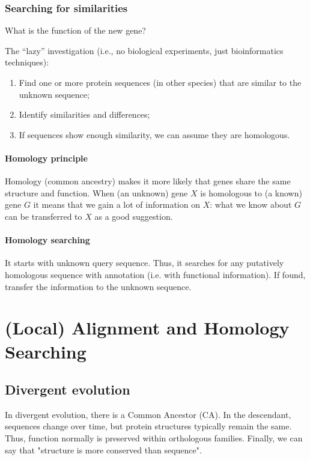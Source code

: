 \subsection{Searching for similarities}

What is the function of the new gene?

The “lazy” investigation (i.e., no biological experiments, just bioinformatics
techniques):

\begin{enumerate}
\item Find one or more protein sequences (in other species) that are similar to
the unknown sequence;
\item Identify similarities and differences;
\item If sequences show enough similarity, we can assume they are homologous.
\end{enumerate}

\subsubsection{Homology principle}

Homology (common ancestry) makes it more likely that genes share the same
structure and function.
When (an unknown) gene $X$ is homologous to (a known) gene $G$ it means that we
gain a lot of information on $X$: what we know about $G$ can be transferred to $X$
as a good suggestion.

\subsubsection{Homology searching}

It starts with unknown query sequence. Thus, it searches for any putatively
homologous sequence with annotation (i.e. with functional information).
If found, transfer the information to the unknown sequence.

\chapter{(Local) Alignment and Homology Searching}

\section{Divergent evolution}

In divergent evolution, there is a Common Ancestor (CA). In the descendant,
sequences change over time, but protein structures typically remain the same.
Thus, function normally is preserved within orthologous families.
Finally, we can say that "structure is more conserved than sequence".

